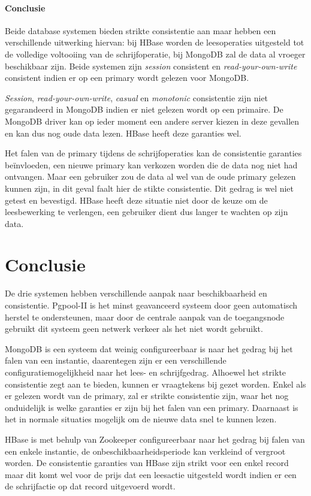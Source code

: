 \paragraph{Conclusie} Beide database systemen bieden strikte consistentie aan maar hebben een verschillende uitwerking hiervan: bij HBase worden de leesoperaties uitgesteld tot de volledige voltooiing van de schrijfoperatie, bij MongoDB zal de data al vroeger beschikbaar zijn. Beide systemen zijn \textit{session} consistent en \textit{read-your-own-write} consistent indien er op een primary wordt gelezen voor MongoDB. 

\textit{Session}, \textit{read-your-own-write}, \textit{casual} en \textit{monotonic} consistentie zijn niet gegarandeerd in MongoDB indien er niet gelezen wordt op een primaire. De MongoDB driver kan op ieder moment een andere server kiezen in deze gevallen en kan dus nog oude data lezen. HBase heeft deze garanties wel. 

Het falen van de primary tijdens de schrijfoperaties kan de consistentie garanties beïnvloeden, een nieuwe primary kan verkozen worden die de data nog niet had ontvangen. Maar een gebruiker zou de data al wel van de oude primary gelezen kunnen zijn, in dit geval faalt hier de stikte consistentie. Dit gedrag is wel niet getest en bevestigd. HBase heeft deze situatie niet door de keuze om de leesbewerking te verlengen, een gebruiker dient dus langer te wachten op zijn data. 

\section{Conclusie}
De drie systemen hebben verschillende aanpak naar beschikbaarheid en consistentie. Pgpool-II is het minst geavanceerd systeem door geen automatisch herstel te ondersteunen, maar door de centrale aanpak van de toegangsnode gebruikt dit systeem geen netwerk verkeer als het niet wordt gebruikt. 

MongoDB is een systeem dat weinig configureerbaar is naar het gedrag bij het falen van een instantie, daarentegen zijn er een verschillende configuratiemogelijkheid naar het lees- en schrijfgedrag. Alhoewel het strikte consistentie zegt aan te bieden, kunnen er vraagtekens bij gezet worden. Enkel als er gelezen wordt van de primary, zal er strikte consistentie zijn, waar het nog onduidelijk is welke garanties er zijn bij het falen van een primary. Daarnaast is het in normale situaties mogelijk om de nieuwe data snel te kunnen lezen. 

HBase is met behulp van Zookeeper configureerbaar naar het gedrag bij falen van een enkele instantie, de onbeschikbaarheidsperiode kan verkleind of vergroot worden. De consistentie garanties van HBase zijn strikt voor een enkel record maar dit komt wel voor de prijs dat een leesactie uitgesteld wordt indien er een de schrijfactie op dat record uitgevoerd wordt. 